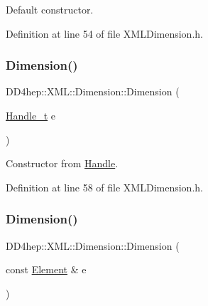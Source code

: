 Default constructor. 



Definition at line 54 of file X\+M\+L\+Dimension.\+h.

\hypertarget{struct_d_d4hep_1_1_x_m_l_1_1_dimension_a8b3cbebb82c2b3570c87147680386c99}{}\label{struct_d_d4hep_1_1_x_m_l_1_1_dimension_a8b3cbebb82c2b3570c87147680386c99} 
\subsubsection{\texorpdfstring{Dimension()}{Dimension()}\hspace{0.1cm}{\footnotesize\ttfamily [2/3]}}
{\footnotesize\ttfamily D\+D4hep\+::\+X\+M\+L\+::\+Dimension\+::\+Dimension (\begin{DoxyParamCaption}\item[{\hyperlink{class_d_d4hep_1_1_x_m_l_1_1_handle__t}{Handle\+\_\+t}}]{e }\end{DoxyParamCaption})\hspace{0.3cm}{\ttfamily [inline]}}



Constructor from \hyperlink{class_d_d4hep_1_1_handle}{Handle}. 



Definition at line 58 of file X\+M\+L\+Dimension.\+h.

\hypertarget{struct_d_d4hep_1_1_x_m_l_1_1_dimension_a692c1ee2c052d427794af750fe2faa6d}{}\label{struct_d_d4hep_1_1_x_m_l_1_1_dimension_a692c1ee2c052d427794af750fe2faa6d} 
\subsubsection{\texorpdfstring{Dimension()}{Dimension()}\hspace{0.1cm}{\footnotesize\ttfamily [3/3]}}
{\footnotesize\ttfamily D\+D4hep\+::\+X\+M\+L\+::\+Dimension\+::\+Dimension (\begin{DoxyParamCaption}\item[{const \hyperlink{class_d_d4hep_1_1_x_m_l_1_1_element}{Element} \&}]{e }\end{DoxyParamCaption})\hspace{0.3cm}{\ttfamily [inline]}}



